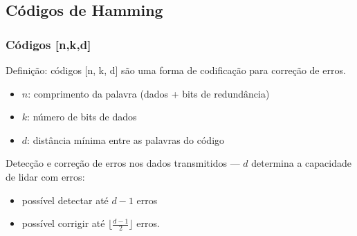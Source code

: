 \subsection{Códigos de Hamming}

\begin{frame}
    \frametitle{Códigos [n,k,d]}
    Definição: códigos [n, k, d] são uma forma de codificação para correção de erros.
    \begin{itemize}
	\item $n$: comprimento da palavra (dados + bits de redundância)
	\item $k$: número de bits de dados
	\item $d$: distância mínima entre as palavras do código
    \end{itemize}

    \vspace{2ex}
    Detecção e correção de erros nos dados transmitidos --- $d$ determina a capacidade de lidar com erros:
    \begin{itemize}
	\item possível detectar até $d-1$ erros
	\item possível corrigir até $\lfloor \frac{d-1}{2} \rfloor$ erros.
    \end{itemize}
\end{frame}

